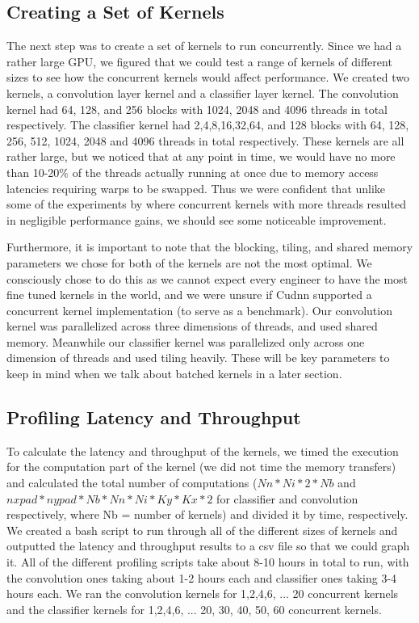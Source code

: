 \documentclass[sigconf]{acmart}
\begin{document}
\subsection{Creating a Set of Kernels	}
The next step was to create a set of kernels to run concurrently. Since we had a rather large GPU, we figured that we could test a range of kernels of different sizes to see how the concurrent kernels would affect performance. We created two kernels, a convolution layer kernel and a classifier layer kernel. The convolution kernel had 64, 128, and 256 blocks with 1024, 2048 and 4096 threads in total respectively. The classifier kernel had 2,4,8,16,32,64, and 128 blocks with 64, 128, 256, 512, 1024, 2048 and 4096 threads in total respectively. These kernels are all rather large, but we noticed that at any point in time, we would have no more than 10-20\% of the threads actually running at once due to memory access latencies requiring warps to be swapped. Thus we were confident that unlike some of the experiments by \cite{wende_cordes_steinke_2012} where concurrent kernels with more threads resulted in negligible performance gains, we should see some noticeable improvement. 

Furthermore, it is important to note that the blocking, tiling, and shared memory parameters we chose for both of the kernels are not the most optimal. We consciously chose to do this as we cannot expect every engineer to have the most fine tuned kernels in the world, and we were unsure if Cudnn supported a concurrent kernel implementation (to serve as a benchmark). Our convolution kernel was parallelized across three dimensions of threads, and used shared memory. Meanwhile our classifier kernel was parallelized only across one dimension of threads and used tiling heavily. These will be key parameters to keep in mind when we talk about batched kernels in a later section. 

\subsection{Profiling Latency and Throughput}

To calculate the latency and throughput of the kernels, we timed the execution for the computation part of the kernel (we did not time the memory transfers) and calculated the total number of computations ($Nn*Ni*2*Nb$ and $nxpad*nypad*Nb*Nn*Ni*Ky*Kx*2$ for classifier and convolution respectively, where Nb = number of kernels) and divided it by time, respectively. We created a bash script to run through all of the different sizes of kernels and outputted the latency and throughput results to a csv file so that we could graph it. All of the different profiling scripts take about 8-10 hours in total to run, with the convolution ones taking about 1-2 hours each and classifier ones taking 3-4 hours each. We ran the convolution kernels for 1,2,4,6, ... 20 concurrent kernels and the classifier kernels for 1,2,4,6, ... 20, 30, 40, 50, 60 concurrent kernels. 
\end{document}

